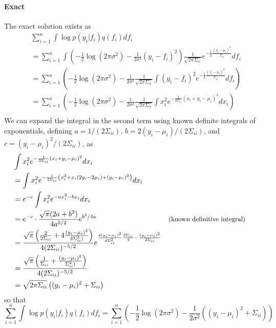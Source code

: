\documentclass[5p,11pt]{article}
\begin{document}
\paragraph{Exact} The exact solution exists as
\begin{equation}
    \begin{aligned}
    &\sum_{i=1}^n \int \log p(y_i|f_i) q(f_i) df_i\\
    &= \sum_{i=1}^n \int \left( -\frac{1}{2}\log(2\pi\sigma^2) - \frac{1}{2\sigma^2}(y_i-f_i)^2 \right) \frac{1}{\sqrt{2\pi\Sigma_{ii}}}e^{-\frac{1}{2}\frac{(f_i-\mu_i)^2}{\Sigma_{ii}}} df_i\\
    &= \sum_{i=1}^n \left( -\frac{1}{2}\log(2\pi\sigma^2) - \frac{1}{2\sigma^2} \frac{1}{\sqrt{2\pi\Sigma_{ii}}} \int (y_i-f_i)^2 e^{-\frac{1}{2}\frac{(f_i-\mu_i)^2}{\Sigma_{ii}}} df_i \right)\\
    &= \sum_{i=1}^n \left( -\frac{1}{2}\log(2\pi\sigma^2) - \frac{1}{2\sigma^2} \frac{1}{\sqrt{2\pi\Sigma_{ii}}} \int x_i^2 e^{-\frac{1}{2\Sigma_{ii}}(x_i+y_i-\mu_i)^2} dx_i \right)\\
    \end{aligned}
\end{equation}
We can expand the integral in the second term using known definite integrals of exponentials, defining $a = 1/(2\Sigma_{ii})$, $b = 2(y_i-\mu_i)/(2\Sigma_{ii})$, and $c = (y_i-\mu_i)^2/(2\Sigma_{ii})$, as
\begin{equation}
    \begin{aligned}
    &\int x_i^2 e^{-\frac{1}{2\Sigma_{ii}}(x_i+y_i-\mu_i)^2} dx_i\\
    &= \int x_i^2 e^{-\frac{1}{2\Sigma_{ii}}\left(x_i^2+x_i(2y_i-2\mu_i)+(y_i-\mu_i)^2\right)} dx_i\\
    &= e^{-c} \int x_i^2 e^{-ax_i^2-bx_i} dx_i\\
    &= e^{-c} \cdot \frac{\sqrt{\pi}(2a+b^2)}{4a^{5/2}} e^{b^2/4a} && \text{\small(known definitive integral)} \\
    &= \frac{\sqrt{\pi}\left(\frac{2}{2\Sigma_{ii}}+4\frac{(y_i-\mu_i)^2}{4\Sigma_{ii}^2)}\right)}{4(2\Sigma_{ii})^{-5/2}} e^{\frac{4(y_i-\mu_i)^2}{4\Sigma_{ii}^2}\frac{2\Sigma_{ii}}{4} - \frac{(y_i-\mu_i)^2}{2\Sigma_{ii}}}\\
    &= \frac{\sqrt{\pi}\left(\frac{1}{\Sigma_{ii}}+\frac{(y_i-\mu_i)^2}{\Sigma_{ii}^2)}\right)}{4(2\Sigma_{ii})^{-5/2}}\\
    &= \sqrt{2\pi\Sigma_{ii}} \left((y_i-\mu_i)^2 + \Sigma_{ii}\right)
    \end{aligned}
\end{equation}
so that
$$ \sum_{i=1}^n \int \log p(y_i|f_i) q(f_i) df_i = \sum_{i=1}^n \left( -\frac{1}{2}\log(2\pi\sigma^2) - \frac{1}{2\sigma^2}\left( (y_i-\mu_i)^2 + \Sigma_{ii}\right) \right)$$
\end{document}
